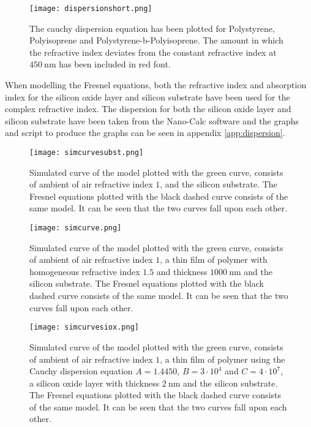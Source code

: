 \documentclass[MasterThesisMain.tex]{subfiles}
\begin{document}
\begin{figure}[H]
\centering
\texttt{[image: dispersionshort.png]}
\caption{The cauchy dispersion equation has been plotted for Polystyrene, Polyisoprene and Polystyrene-b-Polyisoprene. The amount in which the refractive index deviates from the constant refractive index at $\SI{450}{\nano\meter}$ has been included in red font.}
\label{fig:dispshort}
\end{figure} 

When modelling the Fresnel equations, both the refractive index and absorption index for the silicon oxide layer and silicon substrate have been used for the complex refractive index. The dispersion for both the silicon oxide layer and silicon substrate have been taken from the Nano-Calc software and the graphs and script to produce the graphs can be seen in appendix \ref{app:dispersion}.  

\begin{figure}[H]
\centering
\texttt{[image: simcurvesubst.png]}
\caption{Simulated curve of the model plotted with the green curve, consists of ambient of air refractive index $1$, and the silicon substrate. The Fresnel equations plotted with the black dashed curve consists of the same model. It can be seen that the two curves fall upon each other.}
\label{fig:simmodelsubst}
\end{figure}

\begin{figure}[H]
\centering
\texttt{[image: simcurve.png]}
\caption{Simulated curve of the model plotted with the green curve, consists of ambient of air refractive index $1$, a thin film of polymer with homogeneous refractive index $1.5$ and thickness $\SI{1000}{\nano\meter}$ and the silicon substrate. The Fresnel equations plotted with the black dashed curve consists of the same model. It can be seen that the two curves fall upon each other.}
\label{fig:simmodel1}
\end{figure}

\begin{figure}[H]
\centering
\texttt{[image: simcurvesiox.png]}
\caption{Simulated curve of the model plotted with the green curve, consists of ambient of air refractive index $1$, a thin film of polymer using the Cauchy dispersion equation $A=1.4450$, $B=3 \cdot 10^4$ and $C=4 \cdot 10^7$, a silicon oxide layer with thickness $\SI{2}{\nano\meter}$ and the silicon substrate. The Fresnel equations plotted with the black dashed curve consists of the same model. It can be seen that the two curves fall upon each other.}
\label{fig:simmodel2}
\end{figure}
\end{document}
